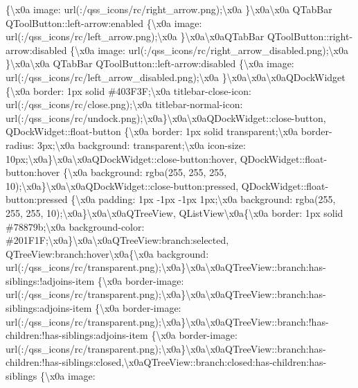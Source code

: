 \{\textbackslash{}x0a image\+: url(\+:/qss\+\_\+icons/rc/right\+\_\+arrow.\+png);\textbackslash{}x0a \}\textbackslash{}x0a\textbackslash{}x0a Q\+Tab\+Bar Q\+Tool\+Button\+::left-\/arrow\+:enabled \{\textbackslash{}x0a image\+: url(\+:/qss\+\_\+icons/rc/left\+\_\+arrow.\+png);\textbackslash{}x0a \}\textbackslash{}x0a\textbackslash{}x0a\+Q\+Tab\+Bar Q\+Tool\+Button\+::right-\/arrow\+:disabled \{\textbackslash{}x0a image\+: url(\+:/qss\+\_\+icons/rc/right\+\_\+arrow\+\_\+disabled.\+png);\textbackslash{}x0a \}\textbackslash{}x0a\textbackslash{}x0a Q\+Tab\+Bar Q\+Tool\+Button\+::left-\/arrow\+:disabled \{\textbackslash{}x0a image\+: url(\+:/qss\+\_\+icons/rc/left\+\_\+arrow\+\_\+disabled.\+png);\textbackslash{}x0a \}\textbackslash{}x0a\textbackslash{}x0a\textbackslash{}x0a\+Q\+Dock\+Widget \{\textbackslash{}x0a border\+: 1px solid \#403\+F3\+F;\textbackslash{}x0a titlebar-\/close-\/icon\+: url(\+:/qss\+\_\+icons/rc/close.\+png);\textbackslash{}x0a titlebar-\/normal-\/icon\+: url(\+:/qss\+\_\+icons/rc/undock.\+png);\textbackslash{}x0a\}\textbackslash{}x0a\textbackslash{}x0a\+Q\+Dock\+Widget\+::close-\/button, Q\+Dock\+Widget\+::float-\/button \{\textbackslash{}x0a border\+: 1px solid transparent;\textbackslash{}x0a border-\/radius\+: 3px;\textbackslash{}x0a background\+: transparent;\textbackslash{}x0a icon-\/size\+: 10px;\textbackslash{}x0a\}\textbackslash{}x0a\textbackslash{}x0a\+Q\+Dock\+Widget\+::close-\/button\+:hover, Q\+Dock\+Widget\+::float-\/button\+:hover \{\textbackslash{}x0a background\+: rgba(255, 255, 255, 10);\textbackslash{}x0a\}\textbackslash{}x0a\textbackslash{}x0a\+Q\+Dock\+Widget\+::close-\/button\+:pressed, Q\+Dock\+Widget\+::float-\/button\+:pressed \{\textbackslash{}x0a padding\+: 1px -\/1px -\/1px 1px;\textbackslash{}x0a background\+: rgba(255, 255, 255, 10);\textbackslash{}x0a\}\textbackslash{}x0a\textbackslash{}x0a\+Q\+Tree\+View, Q\+List\+View\textbackslash{}x0a\{\textbackslash{}x0a border\+: 1px solid \#78879b;\textbackslash{}x0a background-\/color\+: \#201\+F1\+F;\textbackslash{}x0a\}\textbackslash{}x0a\textbackslash{}x0a\+Q\+Tree\+View\+:branch\+:selected, Q\+Tree\+View\+:branch\+:hover\textbackslash{}x0a\{\textbackslash{}x0a background\+: url(\+:/qss\+\_\+icons/rc/transparent.\+png);\textbackslash{}x0a\}\textbackslash{}x0a\textbackslash{}x0a\+Q\+Tree\+View\+::branch\+:has-\/siblings\+:!adjoins-\/item \{\textbackslash{}x0a border-\/image\+: url(\+:/qss\+\_\+icons/rc/transparent.\+png);\textbackslash{}x0a\}\textbackslash{}x0a\textbackslash{}x0a\+Q\+Tree\+View\+::branch\+:has-\/siblings\+:adjoins-\/item \{\textbackslash{}x0a border-\/image\+: url(\+:/qss\+\_\+icons/rc/transparent.\+png);\textbackslash{}x0a\}\textbackslash{}x0a\textbackslash{}x0a\+Q\+Tree\+View\+::branch\+:!has-\/children\+:!has-\/siblings\+:adjoins-\/item \{\textbackslash{}x0a border-\/image\+: url(\+:/qss\+\_\+icons/rc/transparent.\+png);\textbackslash{}x0a\}\textbackslash{}x0a\textbackslash{}x0a\+Q\+Tree\+View\+::branch\+:has-\/children\+:!has-\/siblings\+:closed,\textbackslash{}x0a\+Q\+Tree\+View\+::branch\+:closed\+:has-\/children\+:has-\/siblings \{\textbackslash{}x0a image\+: 